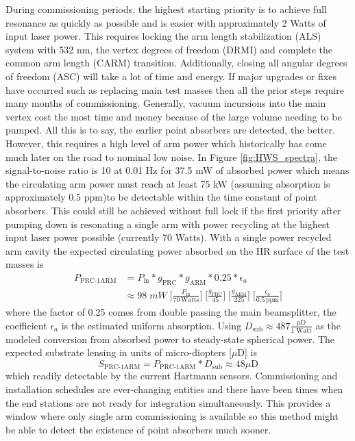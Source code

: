 	During commissioning periods, the highest starting priority is to achieve full resonance as quickly as possible and is easier with approximately 2 Watts of input laser power. This requires locking the arm length stabilization (ALS) system with 532 nm, the vertex degrees of freedom (DRMI) and complete the common arm length (CARM) transition. Additionally, closing all angular degrees of freedom (ASC) will take a lot of time and energy.  If major upgrades or fixes have occurred such as replacing main test masses then all the prior steps require many months of commissioning.  Generally, vacuum incursions into the main vertex cost the most time and money because of the large volume needing to be pumped.  All this is to say, the earlier point absorbers are detected, the better.  However, this requires a high level of arm power which historically has come much later on the road to nominal low noise.  In Figure \ref{fig:HWS_spectra}, the signal-to-noise ratio is 10 at 0.01 Hz for 37.5 mW of absorbed power which means the circulating arm power must reach at least 75 kW  (assuming absorption is approximately 0.5 ppm)to be detectable within the time constant of point absorbers. This could still be achieved without full lock if the first priority after pumping down is resonating a single arm with power recycling at the highest input laser power possible (currently 70 Watts).  With a single power recycled arm cavity the expected circulating power absorbed on the HR surface of the test masses is
	\begin{equation}
	\begin{aligned}
	P_\text{PRC-1ARM} &= P_{\text{in}} * g_{\text{PRC}} * g_{\text{ARM}} * 0.25 * \epsilon_a\\
	&\approx 98 \; mW \; \bigg[\frac{P_{\text{in}}}{70 \, \text{Watts}}\bigg] \; \bigg[\frac{g_{\text{PRC}}}{ 45 }\bigg] \; \bigg[\frac{g_{\text{ARM}}}{ 225 }\bigg] \; \bigg[\frac{\epsilon_a}{0.5 \, \text{ppm}}\bigg]
	\end{aligned}
	\end{equation}
	where the factor of 0.25 comes from double passing the main beamsplitter, the coefficient $\epsilon_a$ is the estimated uniform absorption.  Using $ D_{\text{sub}} \approx 487 \frac{\mu \text{D}}{1 \; \text{Watt}}$ as the modeled conversion from absorbed power to steady-state spherical power.  The expected substrate lensing in units of micro-diopters [$\mu \text{D}$] is
	\begin{equation}
	S_\text{PRC-1ARM} = P_\text{PRC-1ARM} *  D_{\text{sub}} \approx 48 \mu\text{D}
	\end{equation}
	 which readily detectable by the current Hartmann sensors. Commissioning and installation schedules are ever-changing entities and there have been times when the end stations are not ready for integration simultaneously. This provides a window where only single arm commissioning is available so this method might be able to detect the existence of point absorbers much sooner.
	 
